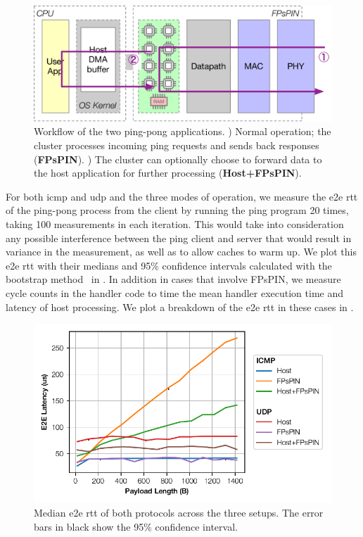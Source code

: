 \begin{figure}
    \centering
    \includegraphics[width=.8\textwidth]{figures/demo-apps.pdf}
    \caption[Workflow of the ping-pong demo]{Workflow of the two ping-pong applications.  ) Normal operation; the cluster processes incoming ping requests and sends back responses (\textbf{FPsPIN}).  ) The cluster can optionally choose to forward data to the host application for further processing (\textbf{Host+FPsPIN}).} \label{fig:demo-pingpong}
\end{figure}

For both \ac{icmp} and \ac{udp} and the three modes of operation, we measure the \ac{e2e} \ac{rtt} of the ping-pong process from the client by running the ping program 20 times, taking 100 measurements in each iteration.  This would take into consideration any possible interference between the ping client and server that would result in variance in the measurement, as well as to allow caches to warm up.  We plot this \ac{e2e} \ac{rtt} with their medians and 95\% confidence intervals calculated with the bootstrap method~\cite{diciccio_bootstrap_1996} in .  In addition in cases that involve FPsPIN, we measure cycle counts in the handler code to time the mean handler execution time and latency of host processing.  We plot a breakdown of the \ac{e2e} \ac{rtt} in these cases in .

\begin{figure}[tp]
    \centering
    \includegraphics{thesis/figures/pingpong-lat.pdf}
    \caption{Median \ac{e2e} \ac{rtt} of both protocols across the three setups.  The error bars in black show the 95\% confidence interval.} \label{fig:pingpong-lat}
\end{figure}

